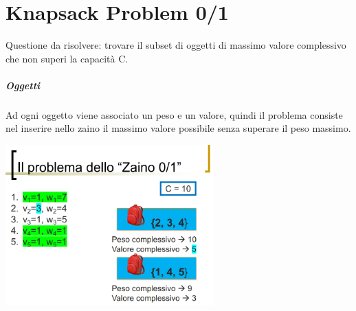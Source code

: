\chapter{Knapsack Problem 0/1}
Questione da risolvere: trovare il subset di oggetti di massimo valore complessivo
che non superi la capacità C.
\paragraph*{Oggetti} Ad ogni oggetto viene associato un peso e un valore, quindi il problema
consiste nel inserire nello zaino il massimo valore possibile senza superare il peso massimo.
\begin{center}
    \includegraphics[width=80mm, scale=0.5]{chapters_ulerich/img/knapsack_example.png}
\end{center}

